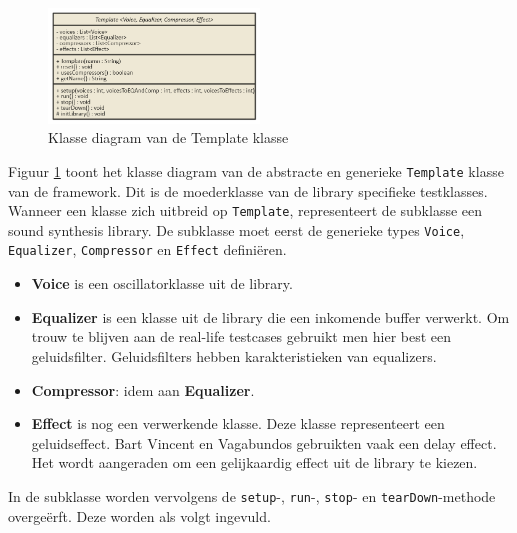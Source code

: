 \begin{figure}
  \centering
    \includegraphics[width=0.5\textwidth]{imgs/nomnoml.png}
  \caption{Klasse diagram van de Template klasse}
  \label{fig:template}
\end{figure}

Figuur \ref{fig:template} toont het klasse diagram van de abstracte en generieke \verb+Template+ klasse van de framework. Dit is de moederklasse van de library specifieke testklasses. Wanneer een klasse zich uitbreid op \verb+Template+, representeert de subklasse een sound synthesis library. De subklasse moet eerst de generieke types \verb+Voice+, \verb+Equalizer+, \verb+Compressor+ en \verb+Effect+ definiëren.

\begin{itemize}
	\item \textbf{Voice} is een oscillatorklasse uit de library.
	\item \textbf{Equalizer} is een klasse uit de library die een inkomende buffer verwerkt. Om trouw te blijven aan de real-life testcases gebruikt men hier best een geluidsfilter. Geluidsfilters hebben karakteristieken van equalizers.
	\item \textbf{Compressor}: idem aan \textbf{Equalizer}.
	\item \textbf{Effect} is nog een verwerkende klasse. Deze klasse representeert een geluidseffect. Bart Vincent en Vagabundos gebruikten vaak een delay effect. \autocite{bartvincent} \autocite{vagabundos} Het wordt aangeraden om een gelijkaardig effect uit de library te kiezen.
\end{itemize}

 In de subklasse worden vervolgens de \verb+setup+-, \verb+run+-, \verb+stop+- en \verb+tearDown+-methode overgeërft. Deze worden als volgt ingevuld.

